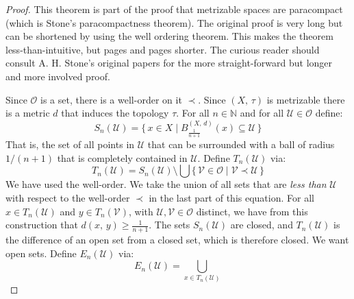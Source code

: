 \documentclass{article}
\theoremstyle{plain}
\theoremstyle{normal}
\begin{document}
        \begin{proof}
            This theorem is part of the proof that metrizable spaces are
            paracompact (which is Stone's paracompactness theorem). The
            original proof is very long but can be shortened by using the
            well ordering theorem. This makes the theorem less-than-intuitive,
            but pages and pages shorter. The curious reader should consult
            A. H. Stone's original papers for the more straight-forward but
            longer and more involved proof.
            \par\hfill\par
            Since $\mathcal{O}$ is a set, there is a well-order on it
            $\prec$. Since $(X,\,\tau)$ is metrizable there is a metric
            $d$ that induces the topology $\tau$. For all $n\in\mathbb{N}$
            and for all $\mathcal{U}\in\mathcal{O}$ define:
            \begin{equation}
                S_{n}(\mathcal{U})=
                \{\,x\in{X}\;|\;
                    {B}_{\frac{1}{n+1}}^{(X,\,d)}(x)\subseteq\mathcal{U}\,\}
            \end{equation}
            That is, the set of all points in $\mathcal{U}$ that can be
            surrounded with a ball of radius $1/(n+1)$ that is completely
            contained in $\mathcal{U}$. Define $T_{n}(\mathcal{U})$ via:
            \begin{equation}
                T_{n}(\mathcal{U})=
                S_{n}(\mathcal{U})\setminus\bigcup
                    \big\{\,\mathcal{V}\in\mathcal{O}\;|\;
                        \mathcal{V}\prec\mathcal{U}\,\big\}
            \end{equation}
            We have used the well-order. We take the union of all sets that are
            \textit{less than} $\mathcal{U}$ with respect to the well-order
            $\prec$ in the last part of this equation. For all
            $x\in{T}_{n}(\mathcal{U})$ and $y\in{T}_{n}(\mathcal{V})$, with
            $\mathcal{U},\mathcal{V}\in\mathcal{O}$ distinct, we have from this
            construction that $d(x,\,y)\geq\frac{1}{n+1}$. The sets
            $S_{n}(\mathcal{U})$ are closed, and $T_{n}(\mathcal{U})$
            is the difference of an open set from a closed set, which is
            therefore closed.
            We want open sets. Define $E_{n}(\mathcal{U})$ via:
            \begin{equation}
                E_{n}(\mathcal{U})=
                \bigcup_{x\in{T}_{n}(\mathcal{U})}

\end{equation}
\end{proof}
\end{document}
